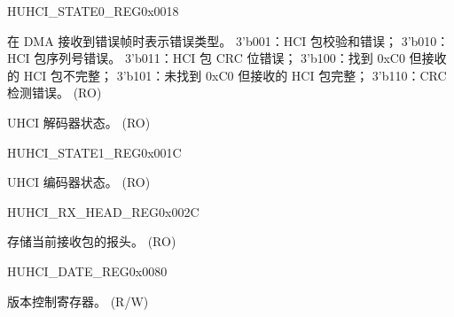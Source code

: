\begin{register}{H}{UHCI\_STATE0\_REG}{0x0018}\label{regdesc:UHCISTATE0REG}
%
%
%
\regnewline%
\begin{regdesc}\begin{reglist}
\label{fielddesc:UHCIRXERRCAUSE}\item [UHCI\_RX\_ERR\_CAUSE] 在 DMA 接收到错误帧时表示错误类型。
3'b001：HCI 包校验和错误； 
3'b010：HCI 包序列号错误。
3'b011：HCI 包 CRC 位错误；
3'b100：找到 0xC0 但接收的 HCI 包不完整；
3'b101：未找到 0xC0 但接收的 HCI 包完整；
3'b110：CRC 检测错误。 (RO)
\label{fielddesc:UHCIDECODESTATE}\item [UHCI\_DECODE\_STATE] UHCI 解码器状态。 (RO)
\end{reglist}\end{regdesc}
\end{register}


\begin{register}{H}{UHCI\_STATE1\_REG}{0x001C}\label{regdesc:UHCISTATE1REG}
%
%
\regnewline%
\begin{regdesc}\begin{reglist}
\label{fielddesc:UHCIENCODESTATE}\item [UHCI\_ENCODE\_STATE] UHCI 编码器状态。 (RO)
\end{reglist}\end{regdesc}
\end{register}


\begin{register}{H}{UHCI\_RX\_HEAD\_REG}{0x002C}\label{regdesc:UHCIRXHEADREG}
%
\regnewline%
\begin{regdesc}\begin{reglist}
\label{fielddesc:UHCIRXHEAD}\item [UHCI\_RX\_HEAD] 存储当前接收包的报头。 (RO)
\end{reglist}\end{regdesc}
\end{register}


\begin{register}{H}{UHCI\_DATE\_REG}{0x0080}\label{regdesc:UHCIDATEREG}
%
\regnewline%
\begin{regdesc}\begin{reglist}
\label{fielddesc:UHCIDATE}\item [UHCI\_DATE] 版本控制寄存器。 (R/W)
\end{reglist}\end{regdesc}
\end{register}
